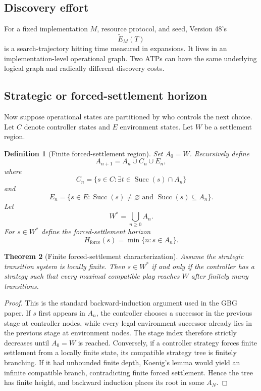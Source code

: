 \documentclass[11pt]{article}
\newtheorem{definition}{Definition}[section]
\newtheorem{theorem}[definition]{Theorem}
\theoremstyle{remark}
\newcommand{\Succ}{\operatorname{Succ}}
\begin{document}
\subsection{Discovery effort}

For a fixed implementation $M$, resource protocol, and seed, Version 48's
\[
\widetilde E_M(T)
\]
is a search-trajectory hitting time measured in expansions. It lives in an implementation-level operational graph. Two ATPs can have the same underlying logical graph and radically different discovery costs.

\subsection{Strategic or forced-settlement horizon}

Now suppose operational states are partitioned by who controls the next choice. Let $C$ denote controller states and $E$ environment states. Let $W$ be a settlement region.

\begin{definition}[Finite forced-settlement region]
Set $A_0=W$. Recursively define
\[
A_{n+1}=A_n\cup C_n\cup E_n,
\]
where
\[
C_n=\{s\in C:\exists t\in\Succ(s)\cap A_n\}
\]
and
\[
E_n=\{s\in E:\Succ(s)\ne\varnothing\text{ and }\Succ(s)\subseteq A_n\}.
\]
Let
\[
W^*=\bigcup_{n\ge0}A_n.
\]
For $s\in W^*$ define the forced-settlement horizon
\[
H_{\mathrm{force}}(s)=\min\{n:s\in A_n\}.
\]
\end{definition}

\begin{theorem}[Finite forced-settlement characterization]
Assume the strategic transition system is locally finite. Then $s\in W^*$ if and only if the controller has a strategy such that every maximal compatible play reaches $W$ after finitely many transitions.
\end{theorem}

\begin{proof}
This is the standard backward-induction argument used in the GBG paper. If $s$ first appears in $A_n$, the controller chooses a successor in the previous stage at controller nodes, while every legal environment successor already lies in the previous stage at environment nodes. The stage index therefore strictly decreases until $A_0=W$ is reached. Conversely, if a controller strategy forces finite settlement from a locally finite state, its compatible strategy tree is finitely branching. If it had unbounded finite depth, Koenig's lemma would yield an infinite compatible branch, contradicting finite forced settlement. Hence the tree has finite height, and backward induction places its root in some $A_N$.
\end{proof}
\end{document}
